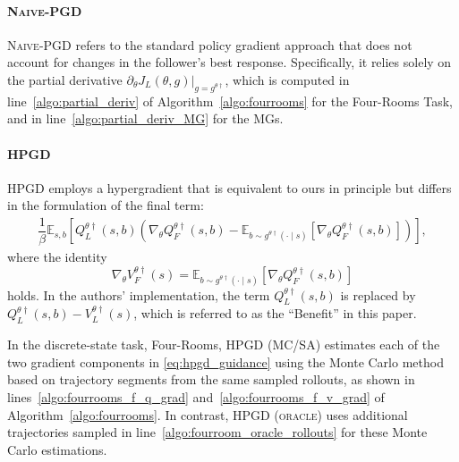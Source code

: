 \documentclass[letterpaper]{article} %
\begin{document}
\paragraph{\textsc{Naive-PGD}}
\textsc{Naive-PGD} refers to the standard policy gradient approach that does not account for changes in the follower’s best response.  
Specifically, it relies solely on the partial derivative $\partial_{\theta} J_L(\theta, g)\big|_{g = g^{\theta\dagger}}$,  
which is computed in line~\ref{algo:partial_deriv} of Algorithm~\ref{algo:fourrooms} for the Four-Rooms Task,  
and in line~\ref{algo:partial_deriv_MG} for the MGs.

\paragraph{\textsc{HPGD}~\citep{Thoma2024-em}}
\textsc{HPGD} employs a hypergradient that is equivalent to ours in principle but differs in the formulation of the final term:
\begin{align}
    \dfrac{1}{\beta}\mathbb{E}_{s,b}\left[Q_L^{\theta\dagger}(s,b)\left(\nabla_{\theta}Q_F^{\theta\dagger}(s,b) - \mathbb{E}_{b \sim g^{\theta\dagger}(\cdot \mid s)}\left[\nabla_{\theta}Q_F^{\theta\dagger}(s,b)\right]\right)\right], \label{eq:hpgd_guidance}
\end{align}
where the identity 
\begin{equation}
    \nabla_{\theta}V_F^{\theta\dagger}(s) = \mathbb{E}_{b \sim g^{\theta\dagger}(\cdot \mid s)}\left[\nabla_{\theta}Q_F^{\theta\dagger}(s,b)\right] \label{eq:bellman_eq_value_q_gradient}
\end{equation} holds.  
In the authors’ implementation, the term $Q_L^{\theta\dagger}(s,b)$ is replaced by $Q_L^{\theta\dagger}(s,b) - V_L^{\theta\dagger}(s)$, which is referred to as the ``Benefit'' in this paper.

In the discrete-state task, Four-Rooms, \textsc{HPGD (MC/SA)} estimates each of the two gradient components in \eqref{eq:hpgd_guidance} using the Monte Carlo method based on trajectory segments from the same sampled rollouts, as shown in lines~\ref{algo:fourrooms_f_q_grad} and~\ref{algo:fourrooms_f_v_grad} of Algorithm~\ref{algo:fourrooms}.
In contrast, \textsc{HPGD (oracle)} uses additional trajectories sampled in line~\ref{algo:fourroom_oracle_rollouts} for these Monte Carlo estimations.
\end{document}

